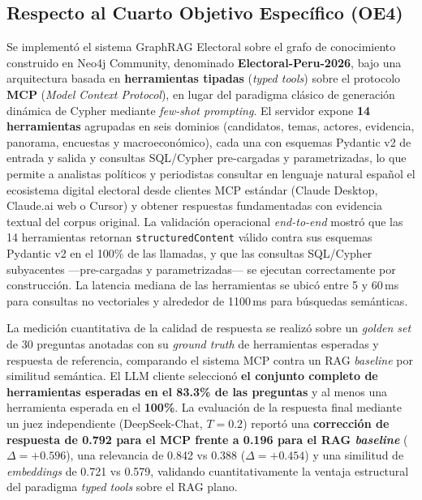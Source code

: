 \subsection*{Respecto al Cuarto Objetivo Específico (OE4)}
Se implementó el sistema GraphRAG Electoral sobre el grafo de conocimiento construido en Neo4j Community, denominado \textbf{Electoral-Peru-2026}, bajo una arquitectura basada en \textbf{herramientas tipadas} (\textit{typed tools}) sobre el protocolo \textbf{MCP} (\textit{Model Context Protocol}), en lugar del paradigma clásico de generación dinámica de Cypher mediante \textit{few-shot prompting}. El servidor expone \textbf{14 herramientas} agrupadas en seis dominios (candidatos, temas, actores, evidencia, panorama, encuestas y macroeconómico), cada una con esquemas Pydantic v2 de entrada y salida y consultas SQL/Cypher pre-cargadas y parametrizadas, lo que permite a analistas políticos y periodistas consultar en lenguaje natural español el ecosistema digital electoral desde clientes MCP estándar (Claude Desktop, Claude.ai web o Cursor) y obtener respuestas fundamentadas con evidencia textual del corpus original. La validación operacional \textit{end-to-end} mostró que las 14 herramientas retornan \texttt{structuredContent} válido contra sus esquemas Pydantic v2 en el 100\% de las llamadas, y que las consultas SQL/Cypher subyacentes —pre-cargadas y parametrizadas— se ejecutan correctamente por construcción. La latencia mediana de las herramientas se ubicó entre 5 y 60\,ms para consultas no vectoriales y alrededor de 1100\,ms para búsquedas semánticas.

La medición cuantitativa de la calidad de respuesta se realizó sobre un \textit{golden set} de 30 preguntas anotadas con su \textit{ground truth} de herramientas esperadas y respuesta de referencia, comparando el sistema MCP contra un RAG \textit{baseline} por similitud semántica. El LLM cliente seleccionó \textbf{el conjunto completo de herramientas esperadas en el 83.3\% de las preguntas} y al menos una herramienta esperada en el \textbf{100\%}. La evaluación de la respuesta final mediante un juez independiente (DeepSeek-Chat, $T=0.2$) reportó una \textbf{corrección de respuesta de 0.792 para el MCP frente a 0.196 para el RAG \textit{baseline}} ($\Delta=+0.596$), una relevancia de 0.842 vs 0.388 ($\Delta=+0.454$) y una similitud de \textit{embeddings} de 0.721 vs 0.579, validando cuantitativamente la ventaja estructural del paradigma \textit{typed tools} sobre el RAG plano.

